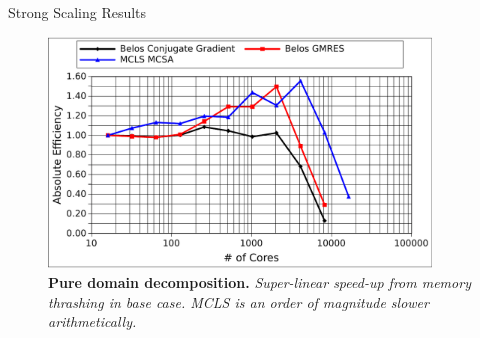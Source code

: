 \documentclass{beamer}
\begin{document}
\begin{frame}{Strong Scaling Results}

  \begin{figure}[htpb!]
    \begin{center}
      \includegraphics[width=4in]{titan_pure_strong.pdf}
    \end{center}
    \caption{\textbf{Pure domain decomposition.} \textit{Super-linear
        speed-up from memory thrashing in base case. MCLS is an order
        of magnitude slower arithmetically.}}
  \end{figure}

\end{frame}
\end{document}
